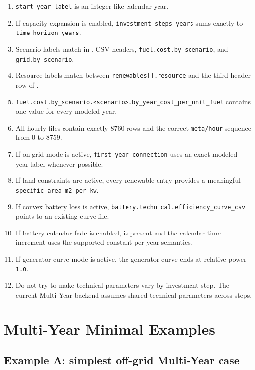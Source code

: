 \documentclass[11pt,a4paper]{report}
\newcommand{\code}[1]{\texttt{#1}}
\begin{document}
\begin{enumerate}[leftmargin=1.5em]
  \item \code{start\_year\_label} is an integer-like calendar year.
  \item If capacity expansion is enabled, \code{investment\_steps\_years} sums exactly to \code{time\_horizon\_years}.
  \item Scenario labels match in , CSV headers, \code{fuel.cost.by\_scenario}, and \code{grid.by\_scenario}.
  \item Resource labels match between \code{renewables[].resource} and the third header row of .
  \item \code{fuel.cost.by\_scenario.<scenario>.by\_year\_cost\_per\_unit\_fuel} contains one value for every modeled year.
  \item All hourly files contain exactly 8760 rows and the correct \code{meta/hour} sequence from 0 to 8759.
  \item If on-grid mode is active, \code{first\_year\_connection} uses an exact modeled year label whenever possible.
  \item If land constraints are active, every renewable entry provides a meaningful \code{specific\_area\_m2\_per\_kw}.
  \item If convex battery loss is active, \code{battery.technical.efficiency\_curve\_csv} points to an existing curve file.
  \item If battery calendar fade is enabled,  is present and the calendar time increment uses the supported constant-per-year semantics.
  \item If generator curve mode is active, the generator curve ends at relative power \code{1.0}.
  \item Do not try to make technical parameters vary by investment step. The current Multi-Year backend assumes shared technical parameters across steps.
\end{enumerate}

\chapter{Multi-Year Minimal Examples}\label{sec:multi-year-examples}

\section{Example A: simplest off-grid Multi-Year case}
\end{document}
